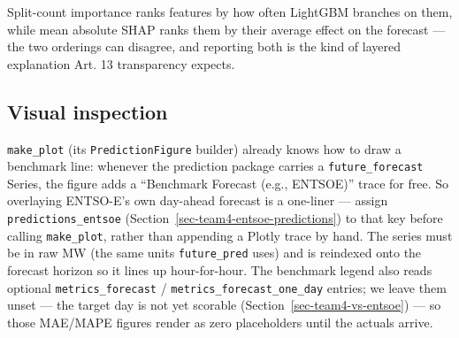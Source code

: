\documentclass[
  english,
  letterpaper,
]{scrbook}
\begin{document}
Split-count importance ranks features by how often LightGBM branches on
them, while mean absolute SHAP ranks them by their average effect on the
forecast --- the two orderings can disagree, and reporting both is the
kind of layered explanation Art. 13 transparency expects.

\subsection{Visual inspection}\label{visual-inspection-1}

\texttt{make\_plot} (its \texttt{PredictionFigure} builder) already
knows how to draw a benchmark line: whenever the prediction package
carries a \texttt{future\_forecast} Series, the figure adds a
``Benchmark Forecast (e.g., ENTSOE)'' trace for free. So overlaying
ENTSO-E's own day-ahead forecast is a one-liner --- assign
\texttt{predictions\_entsoe}
(Section~\ref{sec-team4-entsoe-predictions}) to that key before calling
\texttt{make\_plot}, rather than appending a Plotly trace by hand. The
series must be in raw MW (the same units \texttt{future\_pred} uses) and
is reindexed onto the forecast horizon so it lines up hour-for-hour. The
benchmark legend also reads optional \texttt{metrics\_forecast} /
\texttt{metrics\_forecast\_one\_day} entries; we leave them unset ---
the target day is not yet scorable (Section~\ref{sec-team4-vs-entsoe})
--- so those MAE/MAPE figures render as zero placeholders until the
actuals arrive.
\end{document}
